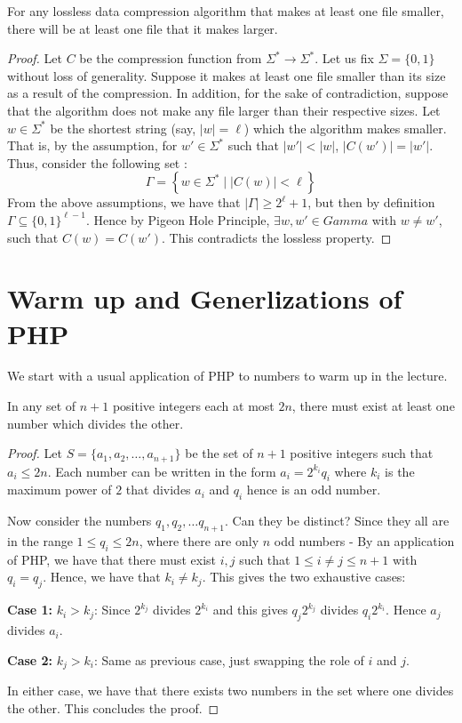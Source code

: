 \begin{theorem}
For any lossless data compression algorithm that makes at least one file smaller, there will be at least one file that it makes larger.
\end{theorem}
\begin{proof}
Let $C$ be the compression function from $\Sigma^* \to \Sigma^*$. Let us fix $\Sigma = \{0,1\}$ without loss of generality.
Suppose it makes at least one file smaller than its size as a result of the compression. In addition, for the sake of contradiction, suppose that the algorithm does not make any file larger than their respective sizes.  Let $w \in \Sigma^*$ be the shortest string (say, $|w| = \ell$) which the algorithm makes smaller. That is, by the assumption, for $w' \in \Sigma^*$ such that $|w'| < |w|$, $|C(w')| = |w'|$. Thus, consider the following set :
$$ \Gamma = \left\{ w \in \Sigma^* \mid | C(w) |  < \ell \right\} $$
From the above assumptions, we have that $|\Gamma| \ge 2^\ell+1$, but then by definition $\Gamma \subseteq \{0,1\}^{\ell-1}$. Hence by Pigeon Hole Principle, $\exists w,w' \in Gamma$ with $w \ne w'$, such that $C(w) = C(w')$. This contradicts the lossless property.
\end{proof}



\section{Warm up and  Generlizations of PHP}

We start with a usual application of PHP to numbers to warm up in the lecture.
\begin{theorem}
In any set of $n+1$ positive integers each at most $2n$, there must exist at least one number which divides the other. 
\end{theorem}
\begin{proof}
Let $S = \{a_1, a_2, \ldots , a_{n+1}\}$ be the set of $n+1$ positive integers such that $a_i \le 2n$. Each number can be written in the form $a_i = 2^{k_i}q_i$ where $k_i$ is the maximum power of $2$ that divides $a_i$ and $q_i$ hence is an odd number.

Now consider the numbers $q_1, q_2, \ldots q_{n+1}$. Can they be distinct? Since they all are in the range $1 \le q_i \le 2n$, where there are only $n$ odd numbers - By an application of PHP, we have that there must exist $i, j$ such that $1 \le i \ne j \le n+1$ with $q_i = q_j$.  Hence, we have that $k_i \ne k_j$. This gives the two exhaustive cases:

\begin{description}
\item{{\bf Case 1:} $k_i > k_j$:} Since $2^{k_j}$ divides $2^{k_i}$ and this gives $q_j2^{k_j}$ divides $q_i2^{k_i}$. Hence $a_j$ divides $a_i$.
\item{{\bf Case 2:} $k_j > k_i$:} Same as previous case, just swapping the role of $i$ and $j$.
\end{description}
In either case, we have that there exists two numbers in the set where one divides the other. This concludes the proof.
\end{proof}


